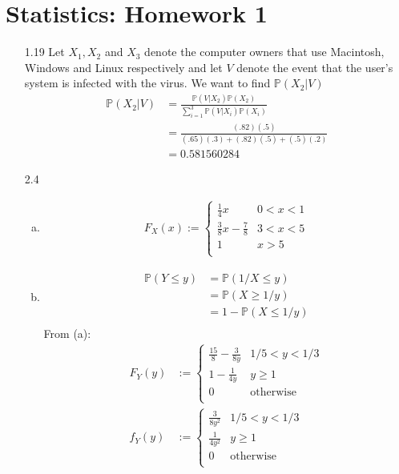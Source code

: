 \documentclass[a4paper,10pt]{article}
\theoremstyle{definition}
\begin{document}
\section*{Statistics: Homework 1}

\begin{enumerate}
\item[1.19] Let $X_1, X_2$ and $X_3$ denote the computer owners that use Macintosh, Windows and Linux respectively and let $V$ denote the event that the user's system is infected with the virus. We want to find $\mathbb{P}(X_2 | V)$
\begin{align*}
\mathbb{P}(X_2 | V) &= \frac{\mathbb{P}(V|X_2)\mathbb{P}(X_2)}{\sum_{i=1}^{3}\mathbb{P}(V|X_i)\mathbb{P}(X_i)}\\
&=\frac{(.82)(.5)}{(.65)(.3)+(.82)(.5)+(.5)(.2)}\\
&=0.581560284
\end{align*}
\item[2.4] 
\begin{enumerate}[(a)]
\item 
\begin{align*}
F_X(x):= \begin{cases}
\frac{1}{4}x & 0 < x < 1\\
\frac{3}{8}x-\frac{7}{8} & 3 < x < 5\\
1 & x > 5\\
\end{cases}
\end{align*}
\item
\begin{align*}
\mathbb{P}(Y \leq y) &= \mathbb{P}(1/X\leq y)\\
&=\mathbb{P}(X\geq 1/y)\\
&=1 - \mathbb{P}(X\leq 1/y)\\
\end{align*}
From (a):
\begin{align*}
F_Y(y)&:= \begin{cases}
\frac{15}{8}-\frac{3}{8y} & 1/5 < y < 1/3\\
1 - \frac{1}{4y} & y \geq 1\\
0 & \text{otherwise}\\
\end{cases}\\
f_Y(y)&:= \begin{cases}
\frac{3}{8y^2} & 1/5 < y < 1/3\\
\frac{1}{4y^2} & y \geq 1\\
0 & \text{otherwise}\\
\end{cases}
\end{align*}


\end{enumerate}
\end{enumerate}
\end{document}
